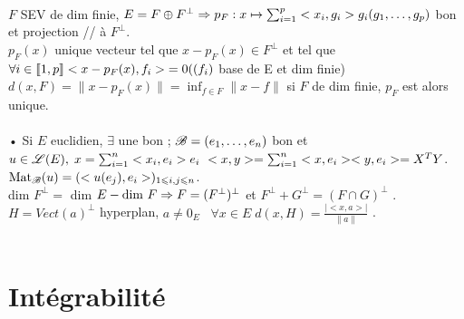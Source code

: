 \documentclass[12 pt]{book}
\begin{document}
\text{}\\
$F$ SEV de dim finie, $E=F\oplus F^\perp \Rightarrow p_F : x \mapsto \sum_{i=1}^p <x_i,g_i>g_i \\ (g_1,\dots,g_p)$ bon et projection // à $F^\perp$.\\
$p_F(x)$ unique vecteur tel que $x-p_F(x)\in F^\perp$ et tel que $\forall i\in \llbracket 1,p\rrbracket < x -p_F(x), f_i> \; = 0 \\ ((f_i)$ base de E et dim finie)\\
$d(x,F) = \| x - p_F(x) \| = \inf_{f\in F} \|x-f\|$ si $F$ de dim finie, $p_F$ est alors unique.\\
\text{}\\
• Si $E$ euclidien, $\exists$ une bon  ;  $\mathscr{B} =(e_1,\dots,e_n)$ bon et $u\in\mathscr{L}(E),\\
\; x=\sum_{i=1}^n <x_i,e_i> e_i  \ <x,y> = \sum_{i=1}^n <x,e_i><y,e_i> = X^T Y$.\\
$\text{Mat}_{\mathscr{B}} (u) = (<u(e_j), e_i> )_{1\leqslant i,j \leqslant n}$.\\
dim $F^\perp = $ dim $E - \text{dim } F \Rightarrow F = (F^\perp)^\perp$ et $F^\perp + G^\perp = (F\cap G)^\perp$ .\\
$H = Vect(a)^\perp$ hyperplan, $a\neq 0_E$ \ $\forall x\in E \; d(x,H) = \frac{|<x,a>|}{\|a\|}$ .\\
\text{}\\
\section*{Intégrabilité}
\end{document}
